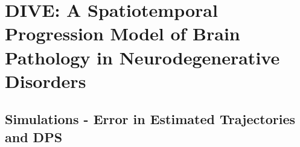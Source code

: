 %
%


\chapter[DIVE: A Spatiotemporal Progression Model of Brain Pathology]{DIVE: A Spatiotemporal Progression Model of Brain Pathology in Neurodegenerative Disorders}
\label{sec:diveAppendix}

\def\ci{\perp\!\!\!\perp}

\clearpage

\section{Simulations - Error in Estimated Trajectories and DPS}


